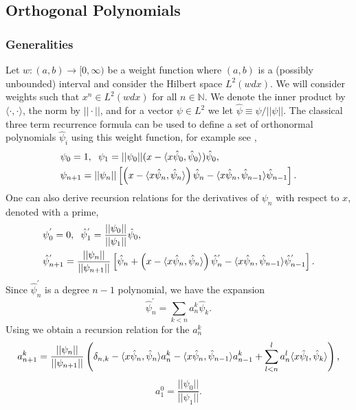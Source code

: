 \subsection{Orthogonal Polynomials}\label{orthopoly_app}
\subsubsection{Generalities}\label{ortho-general}
Let $w:(a,b)\rightarrow [0,\infty)$ be a weight function where $(a,b)$ is a (possibly unbounded) interval and consider the Hilbert space $L^2(w dx)$.   We will consider weights such that $x^n\in L^2(wdx)$ for all $n\in\mathbb{N}$. We denote the inner product by $\langle\cdot,\cdot\rangle$, the norm by $||\cdot||$, and for a vector $\psi\in L^2$ we let $\hat{\psi}\equiv \psi/||\psi||$.  The classical three term recurrence formula can be used to define a set of orthonormal polynomials $\hat{\psi}_i$ using this weight function, for example see \cite{Olver},
\begin{align}\label{poly_recursion}
&\psi_0=1, \hspace{2mm} \psi_1=||\psi_0||(x-\langle x\hat\psi_0,\hat{\psi}_0\rangle)\hat{\psi}_0,\\
&\psi_{n+1}=||\psi_n||\left[\left(x-\langle x\hat\psi_n,\hat\psi_n\rangle\right)\hat\psi_n-\langle x\hat\psi_n,\hat\psi_{n-1}\rangle\hat\psi_{n-1}\right].
\end{align}
One can also derive recursion relations for the derivatives of $\psi_n$ with respect to $x$, denoted with a prime,
\begin{align}\label{deriv_rec}
&\psi_0^{'}=0, \hspace{2mm} \hat{\psi}_1^{'}=\frac{||\psi_0||}{||\psi_1||}\hat\psi_0,\\
&\hat{\psi}_{n+1}^{'}=\frac{||\psi_n||}{||\psi_{n+1}||}\left[\hat\psi_n+\left(x-\langle x\hat\psi_n,\hat\psi_n\rangle\right)\hat{\psi}_n^{'}-\langle x\hat\psi_n,\hat\psi_{n-1}\rangle\hat{\psi}_{n-1}^{'}\right].
\end{align}
Since $\hat{\psi}_n^{'}$ is a degree $n-1$ polynomial, we have the expansion 
\begin{equation}
\hat{\psi}_n^{'}=\sum_{k<n} a_n^k \hat{\psi}_k.
\end{equation}
Using  we obtain a recursion relation for the $a_n^k$
\begin{equation}
a_{n+1}^k=\frac{||\psi_n||}{||\psi_{n+1}||}\left(\delta_{n,k}-\langle x\hat\psi_n,\hat\psi_{n}\rangle a_n^k-\langle x\hat\psi_n,\hat\psi_{n-1}\rangle a_{n-1}^k+\sum_{l<n}^la_n^l\langle x\hat\psi_l,\hat\psi_k\rangle\right),\notag
\end{equation}
\begin{equation}
a_1^0=\frac{||\psi_0||}{||\psi_1||}.
\end{equation}

